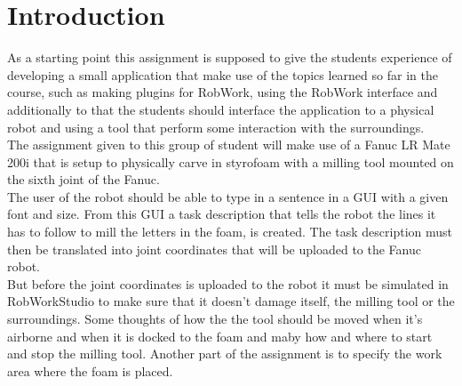 \section{Introduction}
\label{sec:intro}

As a starting point this assignment is supposed to give the students experience of developing a small application that make use of the topics learned so far in the course, such as making plugins for RobWork, using the RobWork interface and additionally to that the students should interface the application to a physical robot and using a tool that perform some interaction with the surroundings.
\\The assignment given to this group of student will make use of a Fanuc LR Mate 200i that is setup to physically carve in styrofoam with a milling tool mounted on the sixth joint of the Fanuc.
\\The user of the robot should be able to type in a sentence in a GUI with a given font and size. From this GUI a task description that tells the robot the lines it has to follow to mill the letters in the foam, is created. The task description must then be translated into joint coordinates that will be uploaded to the Fanuc robot.
\\But before the joint coordinates is uploaded to the robot it must be simulated in RobWorkStudio to make sure that it doesn't damage itself, the milling tool or the surroundings. Some thoughts of how the the tool should be moved when it's airborne and when it is docked to the foam and maby how and where to start and stop the milling tool. Another part of the assignment is to specify the work area where the foam is placed.
